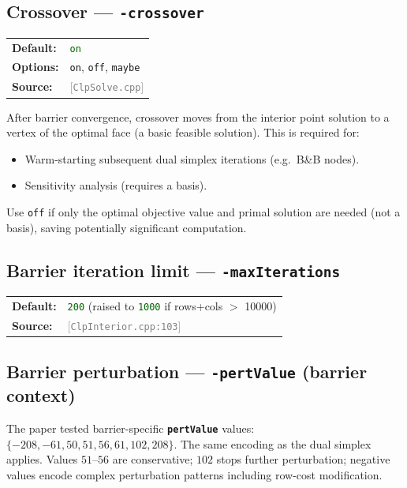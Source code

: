 \documentclass[11pt,a4paper]{article}
\newcommand{\param}[1]{\texttt{\textbf{#1}}}
\newcommand{\val}[1]{\texttt{#1}}
\newcommand{\src}[1]{\textcolor{gray}{\small[\texttt{#1}]}}
\newcommand{\default}[1]{\textcolor{darkgreen}{\texttt{#1}}}
\begin{document}
\subsection{Crossover --- \param{-crossover}}

\begin{tabular}{@{}ll@{}}
  \textbf{Default:} & \default{on} \\
  \textbf{Options:} & \val{on}, \val{off}, \val{maybe} \\
  \textbf{Source:}  & \src{ClpSolve.cpp}
\end{tabular}

\medskip
After barrier convergence, crossover moves from the interior point solution to
a vertex of the optimal face (a basic feasible solution). This is required for:
\begin{itemize}[noitemsep]
  \item Warm-starting subsequent dual simplex iterations (e.g.\ B\&B nodes).
  \item Sensitivity analysis (requires a basis).
\end{itemize}

Use \val{off} if only the optimal objective value and primal solution are needed
(not a basis), saving potentially significant computation.

\subsection{Barrier iteration limit --- \param{-maxIterations}}

\begin{tabular}{@{}ll@{}}
  \textbf{Default:} & \default{200} (raised to \default{1000} if rows+cols $>$ 10000) \\
  \textbf{Source:}  & \src{ClpInterior.cpp:103}
\end{tabular}

\subsection{Barrier perturbation --- \param{-pertValue} (barrier context)}

The paper tested barrier-specific \param{pertValue} values:
$\{-208, -61, 50, 51, 56, 61, 102, 208\}$.
The same encoding as the dual simplex applies. Values $51$--$56$ are conservative;
$102$ stops further perturbation; negative values encode complex perturbation
patterns including row-cost modification.
\end{document}
